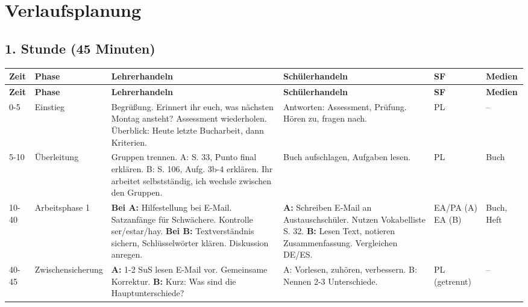 \documentclass[11pt, a4paper]{article}
\begin{document}

\section{Verlaufsplanung}

\subsection{1. Stunde (45 Minuten)}

\small
\begin{longtable}{|p{1.2cm}|p{1.8cm}|p{3.5cm}|p{3.5cm}|p{1.2cm}|p{1.5cm}|}
    \hline
    \textbf{Zeit} & \textbf{Phase} & \textbf{Lehrerhandeln} & \textbf{Schülerhandeln} & \textbf{SF} & \textbf{Medien} \\
    \hline
    \endfirsthead
    \hline
    \textbf{Zeit} & \textbf{Phase} & \textbf{Lehrerhandeln} & \textbf{Schülerhandeln} & \textbf{SF} & \textbf{Medien} \\
    \hline
    \endhead

    0-5 & Einstieg & Begrüßung. \glqq{}Erinnert ihr euch, was nächsten Montag ansteht?\grqq{} Assessment wiederholen. Überblick: Heute letzte Bucharbeit, dann Kriterien. & Antworten: \glqq{}Assessment\grqq{}, \glqq{}Prüfung\grqq{}. Hören zu, fragen nach. & PL & -- \\
    \hline

    5-10 & Überleitung & Gruppen trennen. A: S. 33, Punto final erklären. B: S. 106, Aufg. 3b-4 erklären. \glqq{}Ihr arbeitet selbstständig, ich wechsle zwischen den Gruppen.\grqq{} & Buch aufschlagen, Aufgaben lesen. & PL & Buch \\
    \hline

    10-40 & Arbeits\-phase 1 & \textbf{Bei A:} Hilfestellung bei E-Mail. Satzanfänge für Schwächere. Kontrolle ser/estar/hay. \newline \textbf{Bei B:} Textverständnis sichern, Schlüsselwörter klären. Diskussion anregen. & \textbf{A:} Schreiben E-Mail an Austauschschüler. Nutzen Vokabelliste S. 32. \newline \textbf{B:} Lesen Text, notieren Zusammenfassung. Vergleichen DE/ES. & EA/PA (A) EA (B) & Buch, Heft \\
    \hline

    40-45 & Zwischen\-sicherung & \textbf{A:} 1-2 SuS lesen E-Mail vor. Gemeinsame Korrektur. \newline \textbf{B:} Kurz: \glqq{}Was sind die Hauptunterschiede?\grqq{} & A: Vorlesen, zuhören, verbessern. \newline B: Nennen 2-3 Unterschiede. & PL (getrennt) & -- \\
    \hline
\end{longtable}
\normalsize
\end{document}
